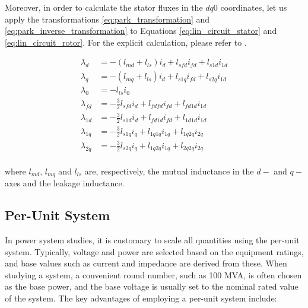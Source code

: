 Moreover, in order to calculate the stator fluxes in the $dq0$ coordinates, let
us apply the transformations \ref{eq:park_transformation} and
\ref{eq:park_inverse_transformation} to Equations \ref{eq:lin_circuit_stator}
and \ref{eq:lin_circuit_rotor}. For the explicit calculation, please refer to
\cite{krause2002analysis}.

\begin{equation}\label{eq:fluxes_dq0}
    \begin{aligned}
        \lambda_d &= -(l_{md} + l_{ls}) i_d + l_{sfd} i_{fd} + l_{s1d}i_{1d}\\
        \lambda_q &= -(l_{mq} + l_{ls}) i_d + l_{s1q} i_{fd} + l_{s2q}i_{1d}\\
        \lambda_{0} &= -l_{ls} i_0\\
        \lambda_{fd} &= -\frac{3}{2} l_{sfd}i_d + l_{fdfd}i_{fd} + l_{fd1d}i_{1d}\\
        \lambda_{1d} &= -\frac{3}{2} l_{s1d}i_d + l_{fd1d}i_{fd} + l_{1d1d}i_{1d}\\
        \lambda_{1q} &= -\frac{3}{2} l_{s1q}i_q + l_{1q1q}i_{1q} + l_{1q2q}i_{2q}\\
        \lambda_{2q} &= -\frac{3}{2} l_{s2q}i_q + l_{1q2q}i_{1q} + l_{2q2q}i_{2q}\\
    \end{aligned}
\end{equation}

\noindent where $l_{md}$, $l_{mq}$ and $l_{ls}$ are, respectively, the mutual
inductance in the $d-$ and $q-$axes and the leakage inductance.

\subsection{Per-Unit System}

In power system studies, it is customary to scale all quantities using the
per-unit system. Typically, voltage and power are selected based on the
equipment ratings, and base values such as current and impedance are derived
from these. When studying a system, a convenient round number, such as 100 MVA,
is often chosen as the base power, and the base voltage is usually set to the
nominal rated value of the system. The key advantages of employing a per-unit
system include:

